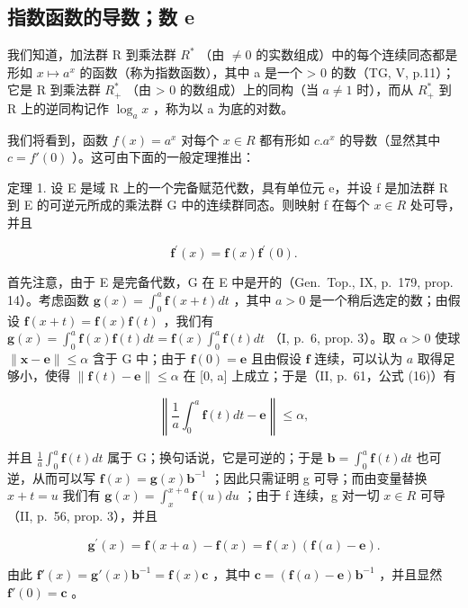 \subsection{指数函数的导数；数 e}

我们知道，加法群 R 到乘法群 \(R^{*}\) （由 \(\neq 0\) 的实数组成）中的每个连续同态都是形如 \(x \mapsto a^{x}\) 的函数（称为指数函数），其中 a 是一个 \textgreater{} 0 的数（TG, V, p.11）；它是 R 到乘法群 \(R_{+}^{*}\) （由 \textgreater{} 0 的数组成）上的同构（当 \(a \neq 1\) 时），而从 \(R_{+}^{*}\) 到 R 上的逆同构记作 \(\log_{a} x\) ，称为以 a 为底的对数。

我们将看到，函数 \(f(x) = a^{x}\) 对每个 \(x \in R\) 都有形如 \(c.a^{x}\) 的导数（显然其中 \(c = f'(0)\) ）。这可由下面的一般定理推出：

定理 1. 设 E 是域 R 上的一个完备赋范代数，具有单位元 e，并设 f 是加法群 R 到 E 的可逆元所成的乘法群 G 中的连续群同态。则映射 f 在每个 \(x \in R\) 处可导，并且

\[
\mathbf {f} ^ {\prime} (x) = \mathbf {f} (x) \mathbf {f} ^ {\prime} (0).\tag{1}
\]

首先注意，由于 E 是完备代数，G 在 E 中是开的（Gen.~Top., IX, p.~179, prop. 14）。考虑函数 \(\mathbf{g}(x) = \int_0^a \mathbf{f}(x + t) dt\) ，其中 \(a > 0\) 是一个稍后选定的数；由假设 \(\mathbf{f}(x + t) = \mathbf{f}(x) \mathbf{f}(t)\) ，我们有 \(\mathbf{g}(x) = \int_0^a \mathbf{f}(x) \mathbf{f}(t) dt = \mathbf{f}(x) \int_0^a \mathbf{f}(t) dt\) （I, p.~6, prop. 3）。取 \(\alpha > 0\) 使球 \(\| \mathbf{x} - \mathbf{e} \| \leqslant \alpha\) 含于 G 中；由于 \(\mathbf{f}(0) = \mathbf{e}\) 且由假设 \(\mathbf{f}\) 连续，可以认为 \(a\) 取得足够小，使得 \(\| \mathbf{f}(t) - \mathbf{e} \| \leqslant \alpha\) 在 {[}0, a{]} 上成立；于是（II, p.~61，公式 (16)）有

\[
\left\| \frac {1}{a} \int_ {0} ^ {a} \mathbf {f} (t) d t - \mathbf {e} \right\| \leqslant \alpha ,
\]

并且 \(\frac{1}{a}\int_{0}^{a}\mathbf{f}(t)dt\) 属于 G；换句话说，它是可逆的；于是 \(\mathbf{b}=\int_{0}^{a}\mathbf{f}(t)dt\) 也可逆，从而可以写 \(\mathbf{f}(x)=\mathbf{g}(x)\mathbf{b}^{-1}\) ；因此只需证明 g 可导；而由变量替换 \(x+t=u\) 我们有 \(\mathbf{g}(x)=\int_{x}^{x+a}\mathbf{f}(u)du\) ；由于 f 连续，g 对一切 \(x\in R\) 可导（II, p.~56, prop. 3），并且

\[
\mathbf {g} ^ {\prime} (x) = \mathbf {f} (x + a) - \mathbf {f} (x) = \mathbf {f} (x) (\mathbf {f} (a) - \mathbf {e}).
\]

由此 \(\mathbf{f}'(x) = \mathbf{g}'(x)\mathbf{b}^{-1} = \mathbf{f}(x)\mathbf{c}\) ，其中 \(\mathbf{c} = (\mathbf{f}(a) - \mathbf{e})\mathbf{b}^{-1}\) ，并且显然 \(\mathbf{f}'(0) = \mathbf{c}\) 。


